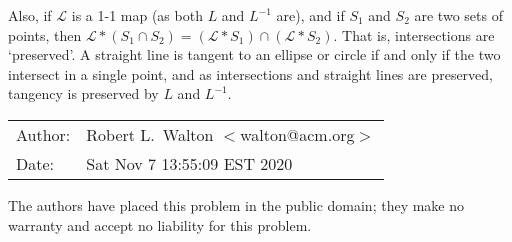 \documentclass[12pt]{article}
\begin{document}
Also, if $\mathcal{L}$ is a 1-1 map (as both $L$ and $L^{-1}$ are),
and if $S_1$ and $S_2$ are two sets of points, then
$\mathcal{L}*(S_1\cap S_2) = (\mathcal{L}*S_1)\cap(\mathcal{L}*S_2)$.
That is, intersections are `preserved'.  A straight line is tangent
to an ellipse or circle if and only if the two intersect in a single
point, and as intersections and straight lines are preserved, tangency
is preserved by $L$ and $L^{-1}$.


\bigskip

\begin{tabular}{ll}
Author:	      & Robert L.~Walton $<$walton@acm.org$>$ \\
Date:         & Sat Nov  7 13:55:09 EST 2020

\end{tabular}

The authors have placed this problem in the public domain;
they make no warranty and accept no liability for this problem.
\end{document}
